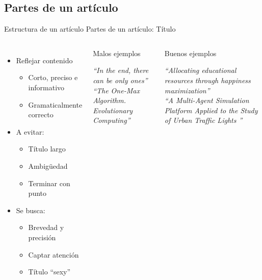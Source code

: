 \documentclass{beamer}
\begin{document}
\subsection{Partes de un artículo}
\begin{frame}{Estructura de un artículo} {Partes de un artículo: Título}
	\begin{columns}
	\begin{itemize}
		\item Reflejar contenido
			\begin{itemize}
			\item Corto, preciso e informativo
			\item Gramaticalmente correcto
			\end{itemize}
		\item A evitar:
			\begin{itemize}
			\item Título largo
			\item Ambigüedad
			\item Terminar con punto
			\end{itemize}
		\item Se busca:
			\begin{itemize}
			\item \alert{Brevedad y precisión}
			\item Captar atención
			\item Título ``sexy''
			\end{itemize}
	\end{itemize}

	\begin{block}{Malos ejemplos}
  	\begin{center}
	\textit{``In the end, there can be only ones''}\\
	\textit{``The One-Max Algorithm. Evolutionary Computing''}
	\end{center}
	\end{block}

	\begin{block}{Buenos ejemplos}
  	\begin{center}
	\textit{``Allocating educational resources through happiness maximization''}\\
	\textit{``A Multi-Agent Simulation Platform Applied to the Study of Urban Traffic Lights ''}
	\end{center}
	\end{block}
	\end{columns}
\end{frame}
\end{document}
